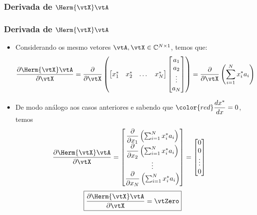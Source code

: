 \subsubsection{Derivada de $\Herm{\vtX} \vtA$}
\begin{frame}
	\frametitle{\normalsize Derivada de $\Herm{\vtX} \vtA$}
	\begin{itemize}
		\item Considerando os mesmo vetores $\vtA, \vtX \in \mathbb{C}^{N \times 1}$, temos que:
		{\tiny
		\begin{align*}
			\frac{\partial \Herm{\vtX} \vtA}{\partial \vtX} &= \frac{\partial}{\partial \vtX} \left(
			\begin{bmatrix}
				x^*_1 & x^*_2 & \dots & x^*_N
			\end{bmatrix} \begin{bmatrix}
				a_{1} \\ a_{2} \\ \vdots \\ a_{N}
			\end{bmatrix} \right) 
			= \frac{\partial}{\partial \vtX} \left( \sum_{i = 1}^N x^*_ia_i \right)
		\end{align*}}
		\item De modo análogo aos casos anteriores e sabendo que $\color{red} \dfrac{dx^*}{dx} = 0$, temos
		{\tiny
		\begin{align*}
			\dfrac{\partial \Herm{\vtX} \vtA}{\partial \vtX} &= \begin{bmatrix}
					\dfrac{\partial}{\partial x_1} \left( \sum_{i = 1}^N x^*_ia_i \right) \\ \dfrac{\partial}{\partial x_2} \left( \sum_{i = 1}^N x^*_ia_i \right) \\ \vdots \\
					\dfrac{\partial}{\partial x_N} \left( \sum_{i = 1}^N x^*_ia_i \right) 
				\end{bmatrix} 
				= \begin{bmatrix}
					0 \\ 0 \\ \vdots \\ 0
				\end{bmatrix}
		\end{align*}}
		\[
			\boxed{\dfrac{\partial \Herm{\vtX} \vtA}{\partial \vtX} = \vtZero}
		\]
	\end{itemize}
\end{frame}

